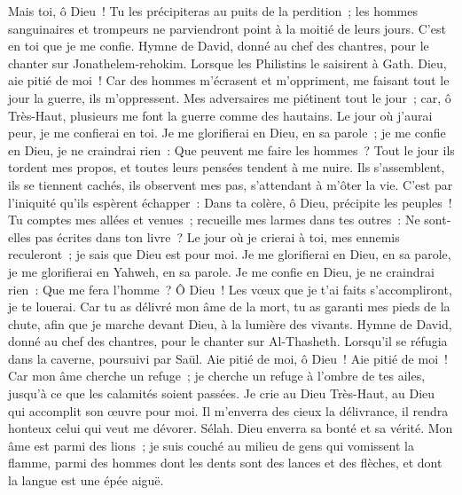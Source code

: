 \begin{multicols}{2}
Mais toi, ô Dieu~! Tu les précipiteras au puits de la perdition~; les hommes sanguinaires et trompeurs ne parviendront point à la moitié de leurs jours. C'est en toi que je me confie.
\VerseOne{}Hymne de David, donné au chef des chantres, pour le chanter sur Jonathelem-rehokim. Lorsque les Philistins le saisirent à Gath.
Dieu, aie pitié de moi~! Car des hommes m'écrasent et m'oppriment, me faisant tout le jour la guerre, ils m'oppressent.
Mes adversaires me piétinent tout le jour~; car, ô Très-Haut, plusieurs me font la guerre comme des hautains.
Le jour où j'aurai peur, je me confierai en toi.
Je me glorifierai en Dieu, en sa parole~; je me confie en Dieu, je ne craindrai rien~: Que peuvent me faire les hommes~?
Tout le jour ils tordent mes propos, et toutes leurs pensées tendent à me nuire.
Ils s'assemblent, ils se tiennent cachés, ils observent mes pas, s'attendant à m'ôter la vie.
C'est par l'iniquité qu'ils espèrent échapper~: Dans ta colère, ô Dieu, précipite les peuples~!
Tu comptes mes allées et venues~; recueille mes larmes dans tes outres~: Ne sont-elles pas écrites dans ton livre~?
Le jour où je crierai à toi, mes ennemis reculeront~; je sais que Dieu est pour moi.
Je me glorifierai en Dieu, en sa parole, je me glorifierai en Yahweh, en sa parole.
Je me confie en Dieu, je ne craindrai rien~: Que me fera l'homme~?
Ô Dieu~! Les vœux que je t'ai faits s'accompliront, je te louerai.
Car tu as délivré mon âme de la mort, tu as garanti mes pieds de la chute, afin que je marche devant Dieu, à la lumière des vivants.
\VerseOne{}Hymne de David, donné au chef des chantres, pour le chanter sur Al-Thasheth. Lorsqu'il se réfugia dans la caverne, poursuivi par Saül.
Aie pitié de moi, ô Dieu~! Aie pitié de moi~! Car mon âme cherche un refuge~; je cherche un refuge à l'ombre de tes ailes, jusqu'à ce que les calamités soient passées.
Je crie au Dieu Très-Haut, au Dieu qui accomplit son œuvre pour moi.
Il m'enverra des cieux la délivrance, il rendra honteux celui qui veut me dévorer. Sélah. Dieu enverra sa bonté et sa vérité.
Mon âme est parmi des lions~; je suis couché au milieu de gens qui vomissent la flamme, parmi des hommes dont les dents sont des lances et des flèches, et dont la langue est une épée aiguë.

\end{multicols}
